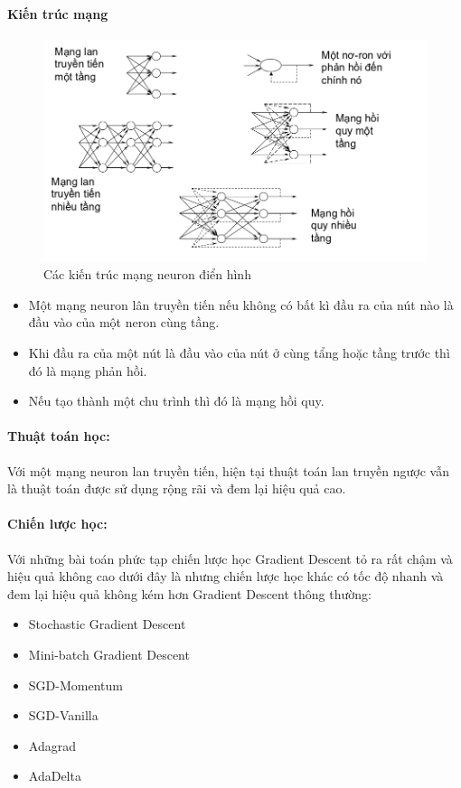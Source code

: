 \documentclass[a4paper,12pt]{report}
\begin{document}
\paragraph{Kiến trúc mạng} 
\begin{figure}[H]
\includegraphics[scale=0.45]{archneuron.png}
\caption{Các kiến trúc mạng neuron điển hình}
\end{figure}
\begin{itemize}
\item Một mạng neuron lân truyền tiến nếu không có bất kì đầu ra của nút nào là đầu vào của một neron cùng tầng.
\item Khi đầu ra của một nút là đầu vào của nút ở cùng tẩng hoặc tầng trước thì đó là mạng phản hồi.
\item Nếu tạo thành một chu trình thì đó là mạng hồi quy.
\end{itemize}
\paragraph{Thuật toán học:} Với một mạng neuron lan truyền tiến, hiện tại thuật toán lan truyền ngược vẫn là thuật toán được sử dụng rộng rãi và đem lại hiệu quả cao.
\paragraph{Chiến lược học:} Với những bài toán phức tạp chiến lược học Gradient Descent tỏ ra rất chậm và hiệu quả không cao dưới đây là nhưng chiến lược học khác có tốc độ nhanh và đem lại hiệu quả không kém hơn Gradient Descent thông thường:
\begin{itemize}
\item Stochastic Gradient Descent
\item Mini-batch Gradient Descent
\item SGD-Momentum
\item SGD-Vanilla
\item Adagrad
\item AdaDelta
\end{itemize}
\end{document}
